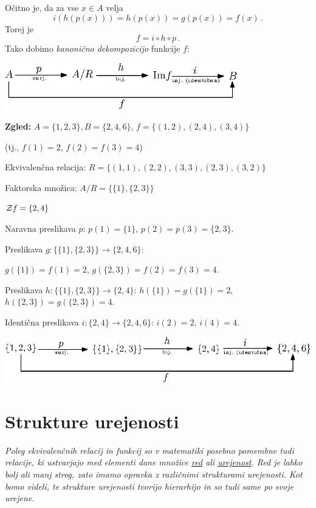 \documentclass[11pt,paper=b5,footinclude,headinclude]{scrbook} %
\begin{document}
Očitno je, da za vse $x\in A$ velja
$$i(h(p(x))) = h(p(x)) = g(p(x)) = f(x)\,.$$
Torej je
$$f = i\circ h\circ p\,.$$
Tako dobimo {\em kanonično dekompozicijo} funkcije $f$:
\begin{center}
\includegraphics[height=20mm]{dekompozicija2.eps}
\end{center}

\textbf{ Zgled:}
$A = \{1,2,3\}, B = \{2,4,6\}$,
$f = \{(1,2),(2,4),(3,4)\}$

(tj., $f(1) = 2$, $f(2)= f(3) = 4$)

Ekvivalenčna relacija: $R = \{(1,1),(2,2),(3,3),(2,3),(3,2)\}$

Faktorska množica: $A/R = \{\{1\},\{2,3\}\}$

${\cal Z} f = \{2,4\}$

Naravna preslikava $p$: $p(1) = \{1\}$, $p(2) = p(3) = \{2,3\}$.

Preslikava $g: \{\{1\},\{2,3\}\}\to \{2,4,6\}$:

$g(\{1\}) = f(1) = 2$, $g(\{2,3\}) = f(2) = f(3) = 4$.

Preslikava $h: \{\{1\},\{2,3\}\}\to \{2,4\}$:
$h(\{1\}) = g(\{1\}) = 2$, $h(\{2,3\}) = g(\{2,3\}) = 4$.

Identična preslikava $i:\{2,4\}\to\{2,4,6\}$: $i(2) = 2$, $i(4) = 4$.

\begin{center}
\includegraphics[height=20mm]{dekompozicija3.eps}
\end{center}

\newpage
\section{Strukture urejenosti}

{\em Poleg ekvivalenčnih relacij in funkcij so v matematiki posebno pomembne tudi relacije, ki ustvarjajo med elementi dane množice \underline{red} ali \underline{urejenost}. Red je lahko bolj ali manj strog, zato imamo opravka z različnimi strukturami urejenosti. Kot bomo videli, te strukture urejenosti tvorijo hierarhijo in so tudi same po svoje urejene.}
\end{document}
